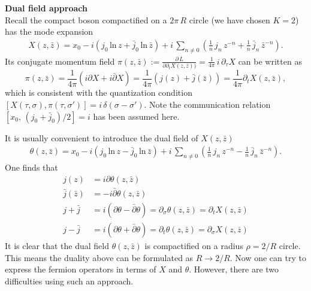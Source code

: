 \documentclass[submission, PhysLectNotes]{SciPost}
\begin{document}
{\bf Dual field approach}\\
Recall the compact boson compactified on a $2\pi\,R$ circle (we have chosen $K=2$) has the mode expansion
\begin{equation}
	\begin{split}
		X(z,\bar{z}) = x_0 -i\left(j_0\,\mathrm{ln}\,z + \bar{j}_0\,\mathrm{ln}\,\bar{z}\right) + i\,\sum_{n\neq0} \left(\frac{1}{n}\,j_n\,z^{-n}+\frac{1}{n}\,\bar{j}_n\,\bar{z}^{-n}\right).
	\end{split}
\end{equation} 
Its conjugate momentum field $\pi(z,\bar{z}):=\frac{\partial\,L}{\partial\partial_tX(z,\bar{z}))} = \frac{1}{4\pi}\,i\,\partial_\tau X$ can be written as
\begin{equation}
	\pi(z,\bar{z}) = \frac{1}{4\pi} \left(i\partial X + i\bar{\partial} X\right) = \frac{1}{4\pi} \left(j(z) + \bar{j}(\bar{z})\right) = \frac{1}{4\pi} \partial_t X(z,\bar{z}),
\end{equation}
which is consistent with the quantization condition $[X(\tau,\sigma),\pi (\tau,\sigma')] = i\,\delta(\sigma-\sigma')$. Note the communication relation $[x_0,\,\left(j_0+\bar{j}_0\right)/2] = i$ has been assumed here. 

It is usually convenient to introduce the dual field of $X(z,\bar{z})$
\begin{equation}
	\begin{split}
		\theta(z,\bar{z}) = x_0 -i\left(j_0\,\mathrm{ln}\,z - \bar{j}_0\,\mathrm{ln}\,\bar{z}\right) + i\,\sum_{n\neq0} \left(\frac{1}{n}\,j_n\,z^{-n}-\frac{1}{n}\,\bar{j}_n\,\bar{z}^{-n}\right).
	\end{split}
\end{equation} 
One finds that 
\begin{equation}
	\begin{split}
		j(z) &= i\partial\theta(z,\bar{z}) \\
		\bar{j}(\bar{z}) &= -i\bar{\partial}\theta(z,\bar{z})\\
		j+\bar{j} &= i\left(\partial\theta-\bar{\partial}\theta\right) = \partial_\sigma \theta(z,\bar{z}) = \partial_t X(z,\bar{z}) \\
		j-\bar{j} &= i\left(\partial\theta+\bar{\partial}\theta\right) = \partial_t \theta(z,\bar{z}) = \partial_\sigma X(z,\bar{z})
	\end{split}
\end{equation}
It is clear that the dual field $\theta(z,\bar{z})$ is compactified on a radius $\rho = 2/R$ circle. This means the duality above can be formulated as $R \rightarrow 2/R$. Now one can try to express the fermion operators in terms of $X$ and $\theta$. However, there are two difficulties using such an approach. 
\end{document}
